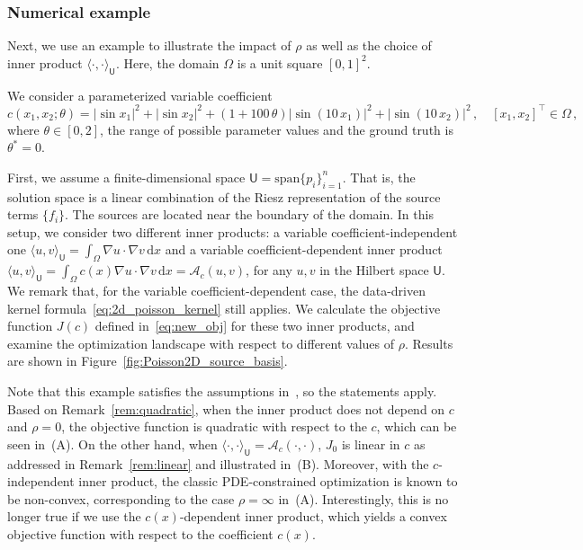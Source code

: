 \documentclass[12pt]{amsart}
\newcommand{\rd}{\mathrm{d}}
\newcommand{\yy}[1]{\textcolor{blue}{{YY: #1}}}
\begin{document}
\subsubsection{Numerical example}
Next, we use an example to illustrate the impact of $\rho$ as well as the choice of inner product $\langle \cdot, \cdot \rangle_{\mathsf{U}}$. Here, the domain $\Omega$ is a unit square $[0,1]^2$.

We consider a parameterized variable coefficient 
\[
c(x_1,x_2;\theta) = |\sin x_1|^2 + |\sin x_2|^2+ (1+100\,\theta)|\sin(10\,x_1)|^2 + |\sin(10\,x_2)|^2\,,\quad [x_1,x_2]^\top \in \Omega\,,
\]
where $\theta \in [0,2]$, the range of possible parameter values and the ground truth is $\theta^* = 0$. 

First, we assume a finite-dimensional space $\mathsf{U} = \text{span}\{p_i\}_{i=1}^n$. That is, the solution space is a linear combination of the Riesz representation of the source terms $\{f_i\}$. The sources are located near the boundary of the domain.
In this setup, we consider two different inner products: a variable coefficient-independent one $\langle u, v\rangle_{\mathsf{U}} = \int_\Omega \nabla u \cdot \nabla v  \,  \mathrm{d}x$ and a variable coefficient-dependent inner product $\langle u, v\rangle_{\mathsf{U}} = \int_\Omega c(x) \nabla u \cdot \nabla v  \,  \mathrm{d}x = \mathcal{A}_c(u,v)$, for any $u, v $ in the Hilbert space $\mathsf{U}$. We remark that, for the variable coefficient-dependent case,  the data-driven kernel formula~\eqref{eq:2d_poisson_kernel} still applies.  We calculate the objective function $J(c)$ defined in~\eqref{eq:new_obj} for these two inner products, and examine the optimization landscape with respect to different values of $\rho$. Results are shown in Figure~\ref{fig:Poisson2D_source_basis}.

Note that this example satisfies the assumptions in~, so the statements apply. Based on Remark~\ref{rem:quadratic}, when the inner product does not depend on $c$ and $\rho = 0$, the objective function is quadratic with respect to the $c$, which can be seen in~(A). On the other hand, when $\langle \cdot, \cdot \rangle_{\mathsf{U}} = \mathcal{A}_c(\cdot, \cdot)$, $J_0$ is linear in $c$ as addressed in Remark~\ref{rem:linear} and illustrated in~(B). Moreover, with the $c$-independent inner product, the classic PDE-constrained optimization is known to be non-convex, corresponding to the case $\rho = \infty$ in~(A). Interestingly, this is no longer true if we use the $c(x)$-dependent inner product, which yields a convex objective function with respect to the coefficient $c(x)$. %
\end{document}
